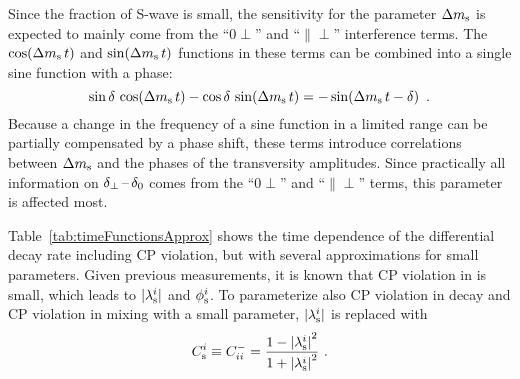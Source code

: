 Since the fraction of S-wave is small, the sensitivity for the parameter $\Delta m_\text{s}$ is expected to mainly come from the ``0$\perp$'' and
``$\parallel\perp$'' interference terms. The $\cos\!\left(\Delta m_\text{s}\, t\right)$ and $\sin\!\left(\Delta m_\text{s}\, t\right)$ functions in these terms can be combined into a single sine function with
a phase:
\begin{equation}
  \sin\delta\, \cos\!\left(\Delta m_\text{s}\, t\right) - \cos\delta\, \sin\!\left(\Delta m_\text{s}\, t\right) = -\sin\!\left(\Delta m_\text{s}\,t - \delta \right) \ .
\end{equation}
Because a change in the frequency of a sine function in a limited range can be partially compensated by a phase shift, these terms
introduce correlations between $\Delta m_\text{s}$ and the phases of the transversity amplitudes. Since practically all information on $\delta_{\perp}\,\text{--}\,\delta_{0}$
comes from the ``0$\perp$'' and ``$\parallel\perp$'' terms, this parameter is affected most.

Table~\ref{tab:timeFunctionsApprox} shows the time dependence of the differential decay rate including CP violation, but with several
approximations for small parameters. Given previous measurements, it is known that CP violation in \BstoJpsiKK{} is small, which leads to
$|{{\lambda_{\text{s}}^{i}}}|$ and $\phi_\text{s}^{i}$. To parameterize also CP violation in decay and CP violation in mixing with a small
parameter, $|{{\lambda_{\text{s}}^{i}}}|$ is replaced with
\begin{equation}
  \label{eq:CsDef}
  \Csi \equiv \Cf[ii]^- = \frac{1-\lamsiSq}{1+\lamsiSq} \ .
\end{equation}


